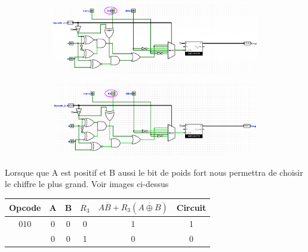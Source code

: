 \documentclass[a4paper]{article}
\begin{document}
\begin{tcolorbox}[colframe=Monokaimagenta,colback=white]
\begin{center}
\smallskip
    
    \begin{figure}[H]
    \centering
    
    \begin{subfigure}{.7\textwidth}
        \centering
        \includegraphics[width=.8\linewidth]{src/COMP_TEST_AlB.png}
        \label{fig:COMPARATEUR_l_EXEMPLE}
   \end{subfigure}
   
   \begin{subfigure}{.7\textwidth}
        \centering
        \includegraphics[width=.8\linewidth]{src/COMP_TEST_AlB1.png}
        \label{fig:COMPARATEUR_l_EXEMPLE_1}
   \end{subfigure}


\end{figure}

         


    Lorsque que A est positif et B aussi le bit de poids fort nous permettra de choisir le chiffre le plus grand. Voir images ci-dessus 
\begin{tabular}{|c|c|c|c|cc|}
\hline    
Opcode & A & B & $R_3$ & $A\overline{B} + {R_3}(\overline{A \oplus B})$ & Circuit\\
\hline
    010    & 0 & 0 & 0     & 1             & 1\\
           & 0 & 0 & 1     & 0             & 0\\
    \hline
         
\end{tabular}

\smallskip
\begin{figure}[H]
    \centering
    

\end{figure}
\end{center}
\end{tcolorbox}
\end{document}
